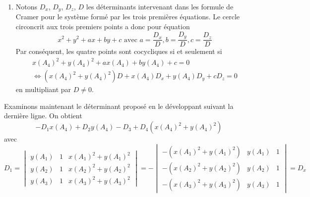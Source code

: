 \begin{enumerate}
\begin{displaymath}
{\begin{vmatrix}
 \end{vmatrix}
}
{ \begin{vmatrix}
  x(A_1) & y(A_1) & 1 \\ x(A_2) & y(A_2) & 1 \\ x(A_3) & y(A_3) & 1 
 \end{vmatrix}
},
-\frac{1}{2}
\frac
{
 \begin{vmatrix}
  x(A_1) & x(A_1)^2+y(A_1)^2  & 1 \\ x(A_2) & x(A_2)^2+y(A_2)^2 & 1 \\ x(A_3) & x(A_3)^2+y(A_3)^2 & 1 
 \end{vmatrix}
}
{ \begin{vmatrix}
  x(A_1) & y(A_1) & 1 \\ x(A_2) & y(A_2) & 1 \\ x(A_3) & y(A_3) & 1 
 \end{vmatrix}
}
 \right) 
\end{displaymath}

 \item Notons $D_x$, $D_y$, $D_z$, $D$ les déterminants intervenant dans les formule de Cramer pour le système formé par les trois premières équations. Le cercle circoncrit aux trois premiers points a donc pour équation
\begin{displaymath}
 x^2+y^2+ax+by+c\text{ avec } a=\frac{D_x}{D}, b=\frac{D_y}{D}, c=\frac{D_z}{D}
\end{displaymath}
Par conséquent, les quatre points sont cocycliques si et seulement si
\begin{multline*}
 x(A_4)^2 + y(A_4)^2 + ax(A_4)+by(A_4)+c=0 \\
\Leftrightarrow 
(x(A_4)^2 + y(A_4)^2)D + x(A_4)D_x + y(A_4)D_y + cD_z=0
\end{multline*}
en multipliant par $D\neq0$.
\end{enumerate}
Examinons maintenant le déterminant proposé en le développant suivant la dernière ligne. On obtient
\begin{displaymath}
 -D_1x(A_4)+D_2y(A_4)-D_3+D_4(x(A_4)^2+y(A_4)^2)
\end{displaymath}
avec
\begin{displaymath}
 D_1 =
\begin{vmatrix}
 y(A_1) & 1 & x(A_1)^2+y(A_1)^2 \\ y(A_2) & 1 & x(A_2)^2+y(A_2)^2 \\ y(A_3) & 1 & x(A_3)^2+y(A_3)^2 
\end{vmatrix}
=-
\begin{vmatrix}
  -(x(A_1)^2+y(A_1)^2) & y(A_1) & 1 \\ -(x(A_2)^2+y(A_2)^2) & y(A_2) & 1 \\  -(x(A_3)^2+y(A_3)^2) & y(A_3) & 1 
\end{vmatrix}
=D_x
\end{displaymath}

